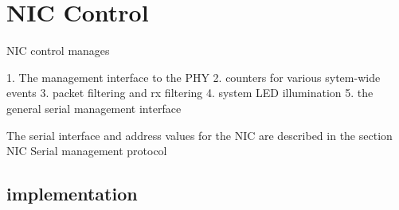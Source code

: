 \section{NIC Control}
NIC control manages

1. The management interface to the PHY
2. counters for various sytem-wide events
3. packet filtering and rx filtering
4. system LED illumination
5. the general serial management interface

The serial interface and address values for the NIC are described in the section {NIC Serial management protocol}

\subsection{implementation}


